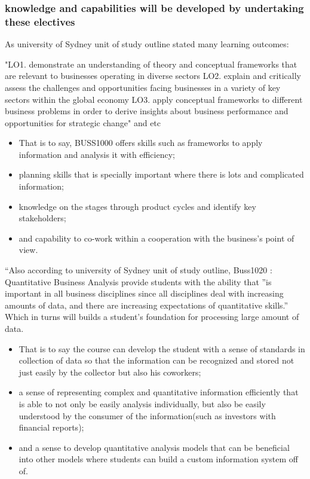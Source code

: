 \documentclass[../draft.tex]{subfiles}
\begin{document}
\subsubsection{knowledge and capabilities will be developed by undertaking these electives}
As university of Sydney unit of study outline stated many learning outcomes:
\begin{displayquote}
"LO1. demonstrate an understanding of theory and conceptual frameworks that are relevant to businesses operating in diverse sectors
LO2. explain and critically assess the challenges and opportunities facing businesses in a variety of key sectors within the global economy 
LO3. apply conceptual frameworks to different business problems in order to derive insights about business performance and opportunities for strategic change" and etc
\end{displayquote}
\begin{itemize}
\item That is to say, BUSS1000 offers skills such as frameworks to apply information and analysis it with efficiency; 
\item planning skills that is specially important where there is lots and complicated information; 
\item knowledge on the stages through product cycles and identify key stakeholders;
\item and capability to co-work within a cooperation with the business’s point of view.
\end{itemize}
``Also according to university of Sydney unit of study outline, Buss1020 : Quantitative Business Analysis provide students with the ability that ”is important in all business disciplines since all disciplines deal with increasing amounts of data, and there are increasing expectations of quantitative skills.” Which in turns will builds a student’s foundation for processing large amount of data. 
\begin{itemize}
\item That is to say the course can develop the student with a sense of standards in collection of data so that the information can be recognized and stored not just easily by the collector but also his coworkers; 
\item a sense of representing complex and quantitative information efficiently that is able to not only be easily analysis individually, but also be easily understood by the consumer of the information(such as investors with financial reports); 
\item and a sense to develop quantitative analysis models that can be beneficial into other models where students can build a custom information system off of.
\end{itemize}
\end{document}
